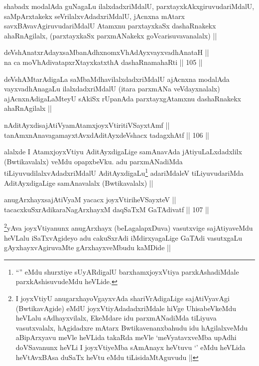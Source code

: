 \begin{artha}
shabadx modalAda guNagaLu ilalxdadxriMdalU, parxtayxkAkxgiruvudariMdalU, saMpArxtakekx seVrilalxvAdadxriMdalU, jAcnxna mAtarx savxBAvavAgiruvudariMdalU Atamxnu parxtayxkaSx dashaRnakekx ahaRnAgilalx, (parxtayxkaSx parxmANakekx goVcarisuvavanalalx) ||
\end{artha}


\begin{shl}
deVshAnatxrAdayxsaMbanAdhxnomxVhAdAyxvayxvadhAnataH ||  \\
na ca moVhAdivatapxrXtayxkatxthA dashaRnamahaRti ||  105 ||  
\end{shl}

\begin{artha}
deVshAMtarAdigaLa saMbaMdhavilalxdadxriMdalU ajAcnxna modalAda vayxvadhAnagaLu ilalxdadxriMdalU (itara parxmANa veVdayxnalalx) ajAcnxnAdigaLaMteyU sAkiSx rUpanAda parxtayxgAtamxnu dashaRnakekx ahaRnAgilalx ||
\end{artha}

\begin{shl}
nA\s \s ditAyxdisajAtiVyamAtamxjoyxVtiritiVSayxtAmf || \\
tanAmxnAnavagamayxtAvxdAditAyxdeVshacx tadagxhAtf ||  106 ||  
\end{shl}

\begin{artha}
alalxde I AtamxjoyxVtiyu AditAyxdigaLige samAnavAda jAtiyuLaLxdadxlilx (Bwtikavalalx) veMdu opapxbeVku. adu parxmANadiMda tiLiyuvudilalxvAdadxriMdalU AditAyxdigaLu\footnote{``\stext'' eMdu shurxtiye sUyARdigalU barxhamxjoyxVtiya parxkAshadiMdale parxkAshisuvudeMdu heVLide.} adariMdaleV tiLiyuvudariMda AditAyxdigaLige samAnavalalx (Bwtikavalalx) ||
\end{artha}

\begin{shl}
anugArxhayxsajAtiVyaM yacacx joyxVtiriheVSayxteV ||  \\
tacacxkuSxrAdikaraNagArxhayxM daqSaTxM GaTAdivatf ||  107 ||  
\end{shl}

\begin{artha}
\footnote{I joyxVtiyU anugarxhayoVgayxvAda shariVrAdigaLige sajAtiVyavAgi (BwtikavAgide) eMdU joyxVtiyAdadadxriMdale hiVge UhisabeVkeMdu heVLalu sAdhayxvilalx, EkeMdare idu parxmANadiMda tiLiyuva vasutxvalalx, hAgidadxre mAtarx Bwtikavenanxbahudu idu hAgilalxveMdu aBipArxyavu meVle heVLida takaRda meVle `meVyatavxveMba upAdhi doVSavanunx heVLi I joyxVtiyeMba sAmAnayx heVtuvu `\stext' eMdu heVLida heVtAvxBAsa duSaTx heVtu eMdu tiLisidaMtAguvudu ||}yAva joyxVtiyanunx anugArxhayx (beLagalapxDuva) vasutxvige sajAtiyaveMdu heVLalu iSaTxvAgideyo adu cakuSxrAdi iMdirxyagaLige GaTAdi vasutxgaLu gAyxhayxvAgiruvaMte gArxhayxveMbudu kaMDide ||
\end{artha}

